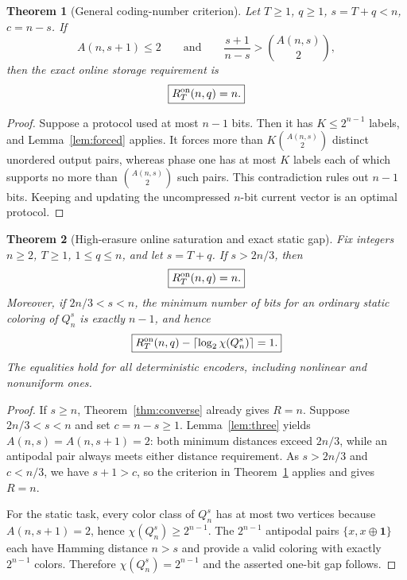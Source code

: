 \documentclass[11pt,a4paper]{article}
\newtheorem{theorem}{Theorem}[section]
\begin{document}
\begin{theorem}[General coding-number criterion]\label{thm:criterion}
Let $T\ge1$, $q\ge1$, $s=T+q<n$, $c=n-s$. If
\begin{equation}\label{eq:criterion}
 A(n,s+1)\le2
 \qquad\text{and}\qquad
 \frac{s+1}{n-s}>\binom{A(n,s)}2,
\end{equation}
then the exact online storage requirement is
\[
 \boxed{R_T^{\rm on}(n,q)=n.}
\]
\end{theorem}
\begin{proof}
Suppose a protocol used at most $n-1$ bits. Then it has $K\le2^{n-1}$ labels, and Lemma~\ref{lem:forced} applies. It forces more than $K\binom{A(n,s)}2$ distinct unordered output pairs, whereas phase one has at most $K$ labels each of which supports no more than $\binom{A(n,s)}2$ such pairs. This contradiction rules out $n-1$ bits. Keeping and updating the uncompressed $n$-bit current vector is an optimal protocol.
\end{proof}

\begin{theorem}[High-erasure online saturation and exact static gap]\label{thm:saturation}
Fix integers $n\ge2$, $T\ge1$, $1\le q\le n$, and let $s=T+q$. If $s>2n/3$, then
\begin{equation}\label{eq:saturation}
 \boxed{R_T^{\rm on}(n,q)=n.}
\end{equation}
Moreover, if $2n/3<s<n$, the minimum number of bits for an ordinary static coloring of $Q_n^s$ is exactly $n-1$, and hence
\begin{equation}\label{eq:gap}
\boxed{R_T^{\rm on}(n,q)-\left\lceil\log_2\chi(Q_n^s)\right\rceil=1.}
\end{equation}
The equalities hold for all deterministic encoders, including nonlinear and nonuniform ones.
\end{theorem}
\begin{proof}
If $s\ge n$, Theorem~\ref{thm:converse} already gives $R=n$. Suppose $2n/3<s<n$ and set $c=n-s\ge1$. Lemma~\ref{lem:three} yields $A(n,s)=A(n,s+1)=2$: both minimum distances exceed $2n/3$, while an antipodal pair always meets either distance requirement. As $s>2n/3$ and $c<n/3$, we have $s+1>c$, so the criterion in Theorem~\ref{thm:criterion} applies and gives $R=n$.

For the static task, every color class of $Q_n^s$ has at most two vertices because $A(n,s+1)=2$, hence $\chi(Q_n^s)\ge2^{n-1}$. The $2^{n-1}$ antipodal pairs $\{x,x\oplus\mathbf1\}$ each have Hamming distance $n>s$ and provide a valid coloring with exactly $2^{n-1}$ colors. Therefore $\chi(Q_n^s)=2^{n-1}$ and the asserted one-bit gap follows.
\end{proof}
\end{document}
